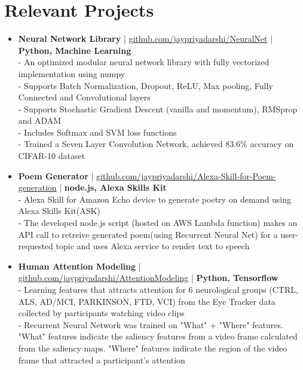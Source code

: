 \section{Relevant Projects}
\begin{itemize}
 \item \textbf{Neural Network Library} | \href{https://github.com/jaypriyadarshi/NeuralNet}{github.com/jaypriyadarshi/NeuralNet} | \textbf{Python, Machine Learning}\\
 - An optimized modular neural network library with fully vectorized implementation using numpy\\
 - Supports Batch Normalization, Dropout, ReLU, Max pooling, Fully Connected and Convolutional layers\\
 - Supports Stochastic Gradient Descent (vanilla and momentum), RMSprop and ADAM\\
 - Includes Softmax and SVM loss functions\\
 - Trained a Seven Layer Convolution Network, achieved 83.6\% accuracy on CIFAR-10 dataset 
\vspace{-1mm}
\item \textbf{Poem Generator} | \href{https://github.com/jaypriyadarshi/Alexa-Skill-for-Poem-generation}{github.com/jaypriyadarshi/Alexa-Skill-for-Poem-generation} | \textbf{node.js, Alexa Skills Kit}\\
 - Alexa Skill for Amazon Echo device to generate poetry on demand using Alexa Skills Kit(ASK)\\
 - The developed node.js script (hosted on AWS Lambda function) makes an API call to retreive generated poem(using Recurrent Neural Net) for a user-requested topic and uses Alexa service to render text to speech
\vspace{-1mm}
 \item \textbf{Human Attention Modeling} | \href{https://github.com/jaypriyadarshi/AttentionModeling}{github.com/jaypriyadarshi/AttentionModeling} | \textbf{Python, Tensorflow}\\
 - Learning features that attracts attention for 6 neurological groups (CTRL, ALS, AD/MCI, PARKINSON, FTD, VCI) from the Eye Tracker data collected by participants watching video clips\\
 - Recurrent Neural Network was trained on "What" + "Where" features. "What" features indicate the saliency features from a video frame calculated from the saliency maps. "Where" features indicate the region of the video frame that attracted a participant's attention


\end{itemize}
\vspace{5pt}

